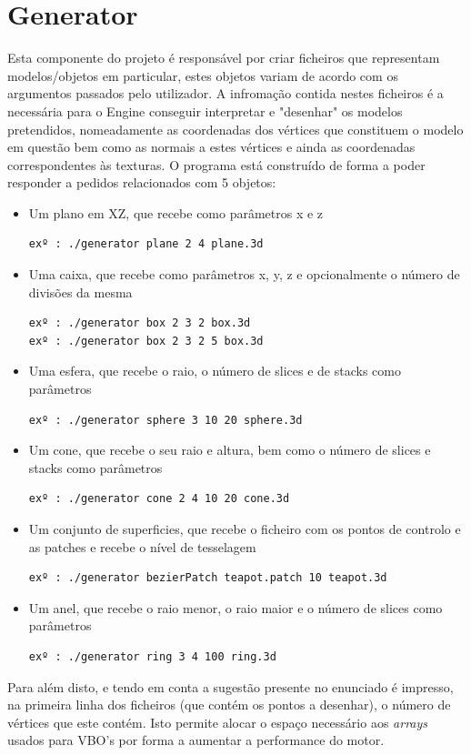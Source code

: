 \documentclass{article}
\begin{document}
\section{Generator}
Esta componente do projeto é responsável por criar ficheiros que representam modelos/objetos em particular, estes objetos variam de acordo com os argumentos passados pelo utilizador. A infromação contida nestes ficheiros é a necessária para o Engine conseguir interpretar e "desenhar" os modelos pretendidos, nomeadamente as coordenadas dos vértices que constituem o modelo em questão bem como as normais a estes vértices e ainda as coordenadas correspondentes às texturas. 
O programa está construído de forma a poder responder a pedidos relacionados com 5 objetos:
\begin{itemize}
    \item Um plano em XZ, que recebe como parâmetros x e z
        \begin{verbatim}
exº : ./generator plane 2 4 plane.3d
        \end{verbatim}
    \item Uma caixa, que recebe como parâmetros x, y, z e opcionalmente o número de divisões da mesma
        \begin{verbatim}
exº : ./generator box 2 3 2 box.3d
exº : ./generator box 2 3 2 5 box.3d
        \end{verbatim}
    \item Uma esfera, que recebe o raio, o número de slices e de stacks como parâmetros
        \begin{verbatim}
exº : ./generator sphere 3 10 20 sphere.3d
        \end{verbatim}
    \item Um cone, que recebe o seu raio e altura, bem como o número de slices e stacks como parâmetros
        \begin{verbatim}
exº : ./generator cone 2 4 10 20 cone.3d
        \end{verbatim}
    \item Um conjunto de superficies, que recebe o ficheiro com os pontos de controlo e as patches e recebe o nível de tesselagem
        \begin{verbatim}
exº : ./generator bezierPatch teapot.patch 10 teapot.3d
        \end{verbatim}
    \item Um anel, que recebe o raio menor, o raio maior e o número de slices como parâmetros
        \begin{verbatim}
exº : ./generator ring 3 4 100 ring.3d
        \end{verbatim}
\end{itemize}
Para além disto, e tendo em conta a sugestão presente no enunciado é impresso, na primeira linha dos ficheiros (que contém os pontos a desenhar), o número de vértices que este contém. Isto permite alocar o espaço necessário aos \textit{arrays} usados para VBO's por forma a aumentar a performance do motor.
\end{document}
